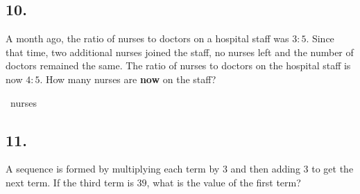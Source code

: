 \documentclass[12pt]{article}
\newenvironment{answer}{\vspace{1em}}{}
\newenvironment{answer}{\vspace{0em}\expandafter\comment}{\expandafter\endcomment}
\newlength{\currentparskip}
\newlength{\currentparindent}
\newenvironment{minipagex}[2][]
  {\setlength{\currentparskip}{\parskip}%
    \setlength{\currentparindent}{\parindent}%
   \begin{minipage}[#1]{#2}%
   \setlength{\parskip}{\currentparskip}%
   \setlength{\parindent}{\currentparindent}%
  }
  {\end{minipage}}
\begin{document}
\subsection*{10.}
A month ago, the ratio of nurses to doctors on a hospital staff was $3:5$. Since that time, two additional nurses joined the staff, no nurses left and the number of doctors remained the same. The ratio of nurses to doctors on the hospital staff is now $4:5$. How many nurses are \textbf{now} on the staff?

\fbox{\phantom{ANSWER}}~nurses

\begin{answer}
%
\end{answer}


\subsection*{11.}
A sequence is formed by multiplying each term by $3$ and then adding $3$ to get the next term. If the third term is $39$, what is the value of the first term? 

\fbox{\phantom{ANSWER}}
\end{document}
